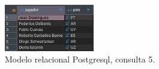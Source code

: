\begin{figure}[H]
\centering
\includegraphics[width=0.35\textwidth]{fotos/q5_rel.png}
\caption{Modelo relacional Postgresql, consulta 5.}
\label{fig:q5_rel}
\end{figure}